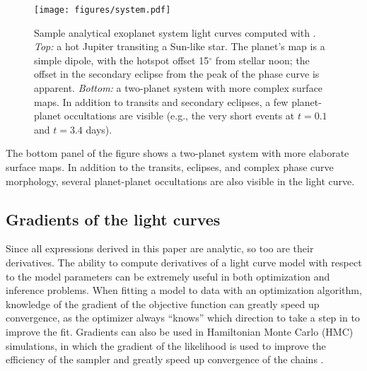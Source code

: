 \documentclass[modern]{aastex61}
\begin{document}
%
\begin{figure}[ht]
    \begin{centering}
    \texttt{[image: figures/system.pdf]}
    \caption{\label{fig:system}
             Sample analytical exoplanet system light curves computed with \starry.
             \emph{Top:} a hot Jupiter
             transiting a Sun-like star. The planet's map is a simple dipole,
             with the hotspot offset 15$^\circ$ from stellar noon; the offset
             in the secondary eclipse from the peak of the phase curve is
             apparent. \emph{Bottom:} a two-planet system with more complex
             surface maps. In addition to transits and secondary eclipses,
             a few planet-planet occultations are visible (e.g., the very short
             events at $t=0.1$ and $t=3.4$ days).}
    \end{centering}
\end{figure}
%

The bottom panel of the figure shows a two-planet system with more elaborate
surface maps. In addition to the transits, eclipses, and complex phase curve
morphology, several planet-planet occultations are also visible in the
light curve.

\subsection{Gradients of the light curves}
\label{sec:gradients}
Since all expressions derived in this paper are analytic, so too are their
derivatives. The ability to compute derivatives of a light curve model with
respect to the model parameters can be extremely useful in both optimization
and inference problems. When fitting a model to data with an optimization
algorithm, knowledge of the gradient of the objective function can greatly
speed up convergence, as the optimizer always ``knows'' which direction to
take a step in to improve the fit. Gradients can also be used in Hamiltonian
Monte Carlo (HMC) simulations, in which the gradient of the likelihood is used
to improve the efficiency of the sampler and greatly speed up convergence of
the chains \citep[e.g.,][]{Betancourt2017}.
\end{document}
